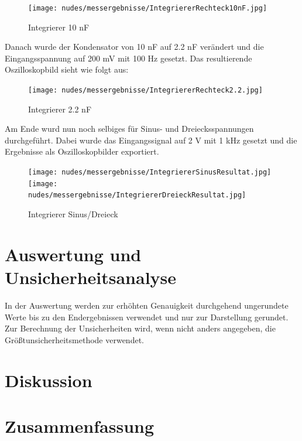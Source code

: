 \documentclass[12pt,a4paper,twoside]{article}
\begin{document}
\begin{figure}[H]
    \centering
    \texttt{[image: nudes/messergebnisse/IntegriererRechteck10nF.jpg]}
    \caption{Integrierer 10 nF}
    \label{fig:IntegriererResultat1}
\end{figure}

\noindent
Danach wurde der Kondensator von 10 nF auf 2.2 nF verändert und die Eingangsspannung auf 200 mV mit 100 Hz gesetzt. Das resultierende Oszilloskopbild sieht wie folgt aus:

\begin{figure}[H]
    \centering
    \texttt{[image: nudes/messergebnisse/IntegriererRechteck2.2.jpg]}
    \caption{Integrierer 2.2 nF}
    \label{fig:IntegriererResultat2}
\end{figure}

\noindent
Am Ende wurd nun noch selbiges für Sinus- und Dreiecksspannungen durchgeführt. Dabei wurde das Eingangssignal auf 2 V mit 1 kHz gesetzt und die Ergebnisse als Oszilloskopbilder exportiert.

\begin{figure}[H]
    \centering
    \texttt{[image: nudes/messergebnisse/IntegriererSinusResultat.jpg]}
    \texttt{[image: nudes/messergebnisse/IntegriererDreieckResultat.jpg]}
    \caption{Integrierer Sinus/Dreieck}
    \label{fig:IntegriererResultat3}
\end{figure}


\section{Auswertung und Unsicherheitsanalyse} %

In der Auswertung werden zur erhöhten Genauigkeit durchgehend ungerundete Werte bis zu den Endergebnissen verwendet und nur zur Darstellung gerundet. \\
Zur Berechnung der Unsicherheiten wird, wenn nicht anders angegeben, die Größtunsicherheitsmethode verwendet.


\section{Diskussion} %


\section{Zusammenfassung} %


\printbibliography[heading=bibintoc]
\end{document}

